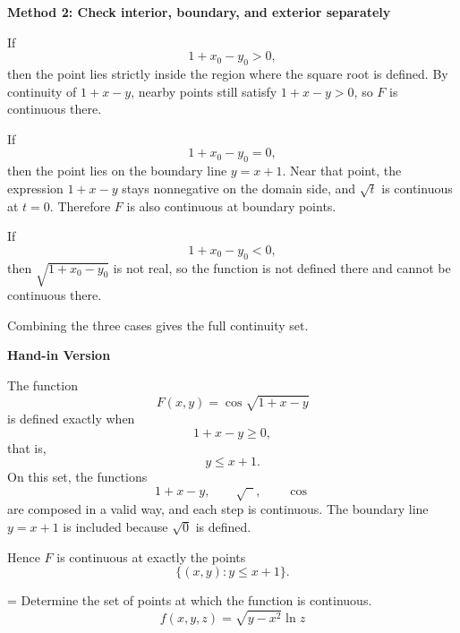 \documentclass[a4paper,12pt,twocolumn]{article}
\newlength{\problemnumberwidth}
\newenvironment{solutionbox}{\begin{framed}}{\end{framed}}
\newcommand{\problem}[3]{%
  \Needspace{10\baselineskip}%
  \phantomsection\label{#1}%
  \par\vspace{0.8em}%
  \noindent
  \hangindent=\problemnumberwidth
  \hangafter=1
  \makebox[\problemnumberwidth][l]{\textbf{#2.}}#3\par
}
\begin{document}
\begin{solutionbox}
\textbf{Method 2: Check interior, boundary, and exterior separately}

\begin{steps}
\item If
\[
1+x_0-y_0>0,
\]
then the point lies strictly inside the region where the square root is defined. By continuity of \(1+x-y\), nearby points still satisfy \(1+x-y>0\), so \(F\) is continuous there.

\item If
\[
1+x_0-y_0=0,
\]
then the point lies on the boundary line \(y=x+1\). Near that point, the expression \(1+x-y\) stays nonnegative on the domain side, and \(\sqrt{t}\) is continuous at \(t=0\). Therefore \(F\) is also continuous at boundary points.

\item If
\[
1+x_0-y_0<0,
\]
then \(\sqrt{1+x_0-y_0}\) is not real, so the function is not defined there and cannot be continuous there.

\item Combining the three cases gives the full continuity set.
\end{steps}
\end{solutionbox}

\begin{solutionbox}
\textbf{Hand-in Version}

The function
\[
F(x,y)=\cos\sqrt{1+x-y}
\]
is defined exactly when
\[
1+x-y\ge 0,
\]
that is,
\[
y\le x+1.
\]
On this set, the functions
\[
1+x-y,\qquad \sqrt{\phantom{u}},\qquad \cos
\]
are composed in a valid way, and each step is continuous. The boundary line \(y=x+1\) is included because \(\sqrt{0}\) is defined.

Hence \(F\) is continuous at exactly the points
\[
\boxed{\{(x,y): y\le x+1\}.}
\]
\end{solutionbox}

\problem{prob:14-2-48}{48}{Determine the set of points at which the function is continuous.
\[
f(x,y,z)=\sqrt{y-x^2}\ln z
\]}
\end{document}
